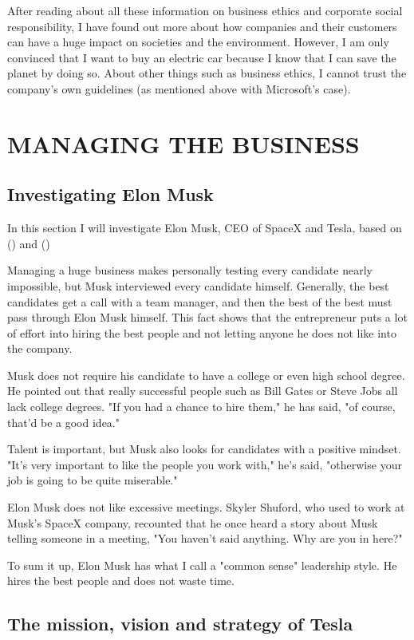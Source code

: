 \documentclass[12pt]{article}
\begin{document}
After reading about all these information on business ethics and corporate social responsibility, I have found out more about how companies and their customers can have a huge impact on societies and the environment. However, I am only convinced that I want to buy an electric car because I know that I can save the planet by doing so. About other things such as business ethics, I cannot trust the company's own guidelines (as mentioned above with Microsoft's case).

\section{MANAGING THE BUSINESS}

\subsection{Investigating Elon Musk}

In this section I will investigate Elon Musk, CEO of SpaceX and Tesla, based on (\cite{ry17}) and (\cite{to17})

Managing a huge business makes personally testing every candidate nearly impossible, but Musk interviewed every candidate himself. Generally, the best candidates get a call with a team manager, and then the best of the best must pass through Elon Musk himself. This fact shows that the entrepreneur puts a lot of effort into hiring the best people and not letting anyone he does not like into the company.

Musk does not require his candidate to have a college or even high school degree. He pointed out that really successful people such as Bill Gates or Steve Jobs all lack college degrees. "If you had a chance to hire them," he has said, "of course, that'd be a good idea."

Talent is important, but Musk also looks for candidates with a positive mindset. "It's very important to like the people you work with," he's said, "otherwise your job is going to be quite miserable."

Elon Musk does not like excessive meetings. Skyler Shuford, who used to work at Musk’s SpaceX company, recounted that he once heard a story about Musk telling someone in a meeting, "You haven’t said anything. Why are you in here?"

To sum it up, Elon Musk has what I call a "common sense" leadership style. He hires the best people and does not waste time.

\subsection{The mission, vision and strategy of Tesla}
\end{document}
